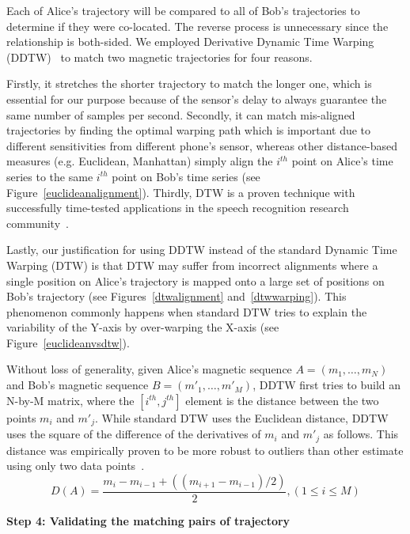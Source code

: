\documentclass[conference]{IEEEtran}
\begin{document}
Each of Alice's trajectory will be compared to all of Bob's trajectories to determine if they were co-located. The reverse process is unnecessary since the relationship is both-sided. We employed Derivative Dynamic Time Warping (DDTW)~\cite{keogh2001derivative} to match two magnetic trajectories for four reasons. 

Firstly, it stretches the shorter trajectory to match the longer one, which is essential for our purpose because of the sensor's delay to always guarantee the same number of samples per second. Secondly, it can match mis-aligned trajectories by finding the optimal warping path which is important due to different sensitivities from different phone's sensor, whereas other distance-based measures (e.g. Euclidean, Manhattan) simply align the $i^{th}$ point on Alice's time series to the same $i^{th}$ point on Bob's time series (see Figure~\ref{euclideanalignment}). Thirdly, DTW is a proven technique with successfully time-tested applications in the speech recognition research community~\cite{senin2008dynamic,hu2003polyphonic}.

Lastly, our justification for using DDTW instead of the standard Dynamic Time Warping (DTW) is that DTW may suffer from incorrect alignments where a single position on Alice's trajectory is mapped onto a large set of positions on Bob's trajectory (see Figures~\ref{dtwalignment} and~\ref{dtwwarping}). This phenomenon commonly happens when standard DTW tries to explain the variability of the Y-axis by over-warping the X-axis (see Figure~\ref{euclideanvsdtw}).

Without loss of generality, given Alice's magnetic sequence $A=(m_1, \dots, m_N)$ and Bob's magnetic sequence $B=(m'_1, \dots, m'_M)$, DDTW first tries to build an N-by-M matrix, where the $[i^{th}, j^{th}]$ element is the distance between the two points $m_i$ and $m'_j$. While standard DTW uses the Euclidean distance, DDTW uses the square of the difference of the derivatives of $m_i$ and $m'_j$ as follows. This distance was empirically proven to be more robust to outliers than other estimate using only two data points~\cite{keogh2001derivative}.
\begin{equation}
D(A) = \frac{m_i - m_{i-1} + ((m_{i+1} - m_{i-1})/2)}{2}, (1 \leq i \leq M)
\end{equation}

\textbf{Step 4: Validating the matching pairs of trajectory}
\end{document}
